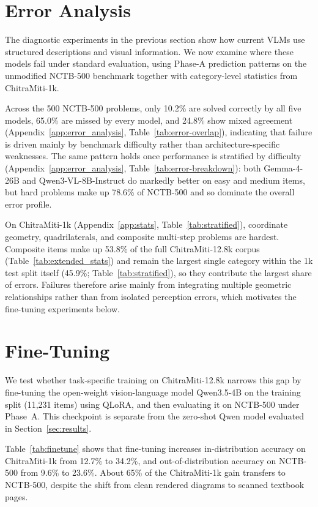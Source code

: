 \documentclass[11pt]{article}
\begin{document}
\section{Error Analysis}
\label{sec:errors}
The diagnostic experiments in the previous section show how current VLMs use structured descriptions and visual information. We now examine where these models fail under standard evaluation, using Phase-A prediction patterns on the unmodified NCTB-500 benchmark together with category-level statistics from ChitraMiti-1k.

Across the 500 NCTB-500 problems, only 10.2\% are solved correctly by all five models, 65.0\% are missed by every model, and 24.8\% show mixed agreement (Appendix~\ref{app:error_analysis}, Table~\ref{tab:error-overlap}), indicating that failure is driven mainly by benchmark difficulty rather than architecture-specific weaknesses. The same pattern holds once performance is stratified by difficulty (Appendix~\ref{app:error_analysis}, Table~\ref{tab:error-breakdown}): both Gemma-4-26B and Qwen3-VL-8B-Instruct do markedly better on easy and medium items, but hard problems make up 78.6\% of NCTB-500 and so dominate the overall error profile.

On ChitraMiti-1k (Appendix~\ref{app:stats}, Table~\ref{tab:stratified}), coordinate geometry, quadrilaterals, and composite multi-step problems are hardest. Composite items make up 53.8\% of the full ChitraMiti-12.8k corpus (Table~\ref{tab:extended_stats}) and remain the largest single category within the 1k test split itself (45.9\%; Table~\ref{tab:stratified}), so they contribute the largest share of errors. Failures therefore arise mainly from integrating multiple geometric relationships rather than from isolated perception errors, which motivates the fine-tuning experiments below.

\section{Fine-Tuning}
\label{sec:finetuning}

We test whether task-specific training on ChitraMiti-12.8k narrows this gap by fine-tuning the open-weight vision-language model Qwen3.5-4B on the training split (11,231 items) using QLoRA, and then evaluating it on NCTB-500 under Phase~A. This checkpoint is separate from the zero-shot Qwen model evaluated in Section~\ref{sec:results}.

Table~\ref{tab:finetune} shows that fine-tuning increases in-distribution accuracy on ChitraMiti-1k from 12.7\% to 34.2\%, and out-of-distribution accuracy on NCTB-500 from 9.6\% to 23.6\%. About 65\% of the ChitraMiti-1k gain transfers to NCTB-500, despite the shift from clean rendered diagrams to scanned textbook pages.
\end{document}
